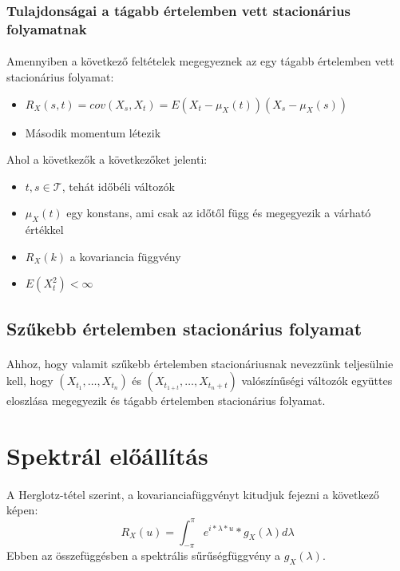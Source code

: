 \documentclass[11pt,a4paper]{article}
\begin{document}
				\subsubsection{Tulajdonságai a tágabb értelemben vett stacionárius folyamatnak}
					\paragraph{}
						Amennyiben a következő feltételek megegyeznek az egy tágabb értelemben vett stacionárius folyamat:
						\begin{itemize}
							\item $R_X(s,t) = cov(X_s, X_t) = E(X_t - \mu_X (t)) (X_s - \mu_X (s))$
							\item Második momentum létezik
						\end{itemize}
						Ahol a következők a következőket jelenti:
						\begin{itemize}
							\item $t, s \in \mathcal{T}$, tehát időbéli változók
							\item $\mu_X (t)$ egy konstans, ami csak az időtől függ és megegyezik a várható értékkel
							\item $R_X(k)$ a kovariancia függvény
							\item $E(X_t^2) < \infty$ 
						\end{itemize}

			\subsection{Szűkebb értelemben stacionárius folyamat}
				\paragraph{}

				Ahhoz, hogy valamit szűkebb értelemben stacionáriusnak nevezzünk teljesülnie kell, hogy $(X_{t_1}, \dots , X_{t_n})$ és $(X_{t_{1+t}}, \dots, X_{t_n + t})$ valószínűségi változók  együttes eloszlása megegyezik és tágabb értelemben stacionárius folyamat.

		\section{Spektrál előállítás}
			\paragraph{}
				A Herglotz-tétel szerint, a kovarianciafüggvényt kitudjuk fejezni a következő képen:
				$$R_X (u)=\int_{-\pi}^\pi e^{i*\lambda*u}*g_X(\lambda)d\lambda$$
				Ebben az összefüggésben a spektrális sűrűségfüggvény a $g_X(\lambda)$.
\end{document}
